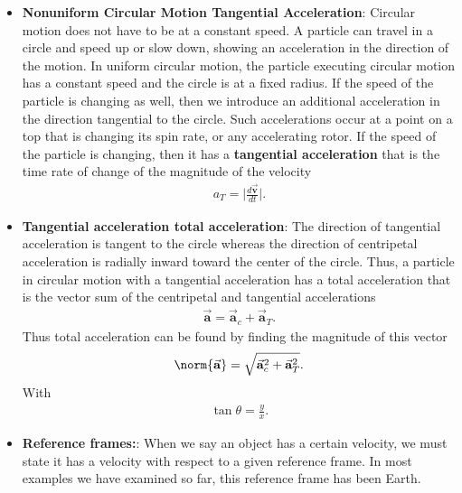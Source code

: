 \documentclass{report}
\begin{document}
\begin{itemize}
            \item \textbf{Nonuniform Circular Motion Tangential Acceleration}:
                Circular motion does not have to be at a constant speed. A particle can travel in a circle and speed up or slow down, showing an acceleration in the direction of the motion.
                \smallbreak \noindent
                In uniform circular motion, the particle executing circular motion has a constant speed and the circle is at a fixed radius. If the speed of the particle is changing as well, then we introduce an additional acceleration in the direction tangential to the circle. Such accelerations occur at a point on a top that is changing its spin rate, or any accelerating rotor.  If the speed of the particle is changing, then it has a \textbf{tangential acceleration} that is the time rate of change of the magnitude of the velocity
                \begin{align*}
                    a_{T} = \bigg\lvert  \frac{d\vec{\mathbf{v}}}{dt} \bigg\rvert
                .\end{align*}
            \item \textbf{Tangential acceleration total acceleration}: 
                The direction of tangential acceleration is tangent to the circle whereas the direction of centripetal acceleration is radially inward toward the center of the circle. Thus, a particle in circular motion with a tangential acceleration has a total acceleration that is the vector sum of the centripetal and tangential accelerations
                \begin{align*}
                    \vec{\mathbf{a}} = \vec{\mathbf{a}}_{c} + \vec{\mathbf{a}}_{T}
                .\end{align*}
                Thus total acceleration can be found by finding the magnitude of this vector
                \begin{align*}
                    \norm{\vec{\mathbf{a}}} = \sqrt{\vec{\mathbf{a}}_{c}^{2} + \vec{\mathbf{a}}_{T}^{2}}
                .\end{align*}
                With 
                \begin{align*}
                    \tan{\theta} = \frac{y}{x}
                .\end{align*}
            \item \textbf{Reference frames:}: When we say an object has a certain velocity, we must state it has a velocity with respect to a given reference frame. In most examples we have examined so far, this reference frame has been Earth.

\end{itemize}
\end{document}
